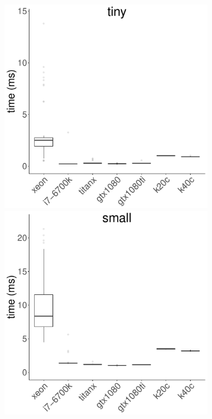 \documentclass[../document.tex]{subfiles}
\begin{document}
\begin{figure}
	\begin{subfigure}{0.09\textwidth} \label{fig:time-kmeans} \vspace{5mm}\end{subfigure}
	\begin{subfigure}{0.9\textwidth}
		\includegraphics[width=\plotwidth]{figures/time-results/generate_kmeans_no_knl_tiny_boxplot-1}
		\includegraphics[width=\plotwidth]{figures/time-results/generate_kmeans_no_knl_small_boxplot-1}

\end{subfigure}
\end{figure}
\end{document}
